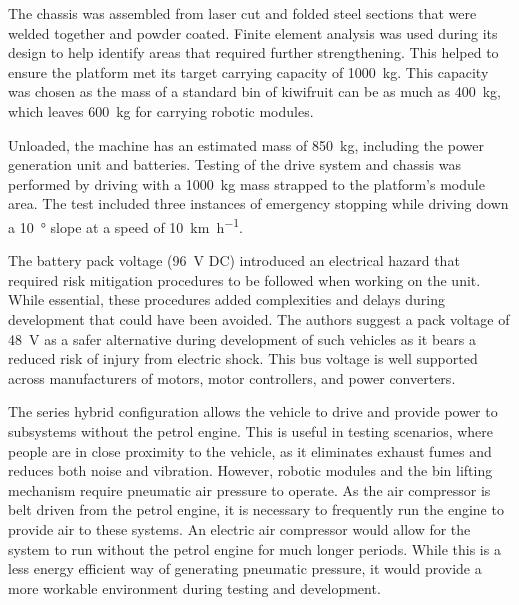 \documentclass[preprint,authoryear,12pt]{elsarticle}
\begin{document}
        The chassis was assembled from laser cut and folded steel sections that were welded together and powder coated.
        Finite element analysis was used during its design to help identify areas that required further strengthening.
        This helped to ensure the platform met its target carrying capacity of \SI{1000}{\kilo\gram}.
        This capacity was chosen as the mass of a standard bin of kiwifruit can be as much as \SI{400}{\kilo\gram}, which leaves \SI{600}{\kilo\gram} for carrying robotic modules.

        Unloaded, the machine has an estimated mass of \SI{850}{\kilo\gram}, including the power generation unit and batteries.
        Testing of the drive system and chassis was performed by driving with a \SI{1000}{\kilo\gram} mass strapped to the platform's module area.
        The test included three instances of emergency stopping while driving down a \SI{10}{\degree} slope at a speed of \SI{10}{\kilo\meter\per\hour}.

        The battery pack voltage (\SI{96}{\volt} DC) introduced an electrical hazard that required risk mitigation procedures to be followed when working on the unit.
        While essential, these procedures added complexities and delays during development that could have been avoided.
        The authors suggest a pack voltage of \SI{48}{\volt} as a safer alternative during development of such vehicles as it bears a reduced risk of injury from electric shock.
        This bus voltage is well supported across manufacturers of motors, motor controllers, and power converters.

        The series hybrid configuration allows the vehicle to drive and provide power to subsystems without the petrol engine.
        This is useful in testing scenarios, where people are in close proximity to the vehicle, as it eliminates exhaust fumes and reduces both noise and vibration.
        However, robotic modules and the bin lifting mechanism require pneumatic air pressure to operate.
        As the air compressor is belt driven from the petrol engine, it is necessary to frequently run the engine to provide air to these systems.
        An electric air compressor would allow for the system to run without the petrol engine for much longer periods.
        While this is a less energy efficient way of generating pneumatic pressure, it would provide a more workable environment during testing and development.
\end{document}
